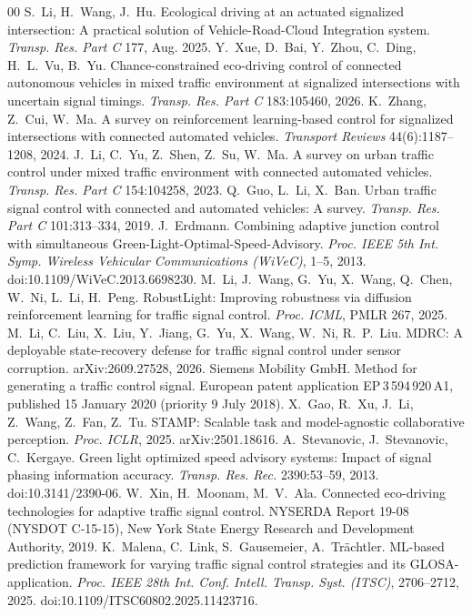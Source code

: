 \begin{thebibliography}{00}
 S.~Li, H.~Wang, J.~Hu. Ecological driving at an actuated signalized intersection: A practical solution of Vehicle-Road-Cloud Integration system. \emph{Transp. Res. Part C} 177, Aug. 2025.
 Y.~Xue, D.~Bai, Y.~Zhou, C.~Ding, H.~L.~Vu, B.~Yu. Chance-constrained eco-driving control of connected autonomous vehicles in mixed traffic environment at signalized intersections with uncertain signal timings. \emph{Transp. Res. Part C} 183:105460, 2026.
 K.~Zhang, Z.~Cui, W.~Ma. A survey on reinforcement learning-based control for signalized intersections with connected automated vehicles. \emph{Transport Reviews} 44(6):1187--1208, 2024.
 J.~Li, C.~Yu, Z.~Shen, Z.~Su, W.~Ma. A survey on urban traffic control under mixed traffic environment with connected automated vehicles. \emph{Transp. Res. Part C} 154:104258, 2023.
 Q.~Guo, L.~Li, X.~Ban. Urban traffic signal control with connected and automated vehicles: A survey. \emph{Transp. Res. Part C} 101:313--334, 2019.
 J.~Erdmann. Combining adaptive junction control with simultaneous Green-Light-Optimal-Speed-Advisory. \emph{Proc. IEEE 5th Int. Symp. Wireless Vehicular Communications (WiVeC)}, 1--5, 2013. doi:10.1109/WiVeC.2013.6698230.
 M.~Li, J.~Wang, G.~Yu, X.~Wang, Q.~Chen, W.~Ni, L.~Li, H.~Peng. RobustLight: Improving robustness via diffusion reinforcement learning for traffic signal control. \emph{Proc. ICML}, PMLR 267, 2025.
 M.~Li, C.~Liu, X.~Liu, Y.~Jiang, G.~Yu, X.~Wang, W.~Ni, R.~P.~Liu. MDRC: A deployable state-recovery defense for traffic signal control under sensor corruption. arXiv:2609.27528, 2026.
 Siemens Mobility GmbH. Method for generating a traffic control signal. European patent application EP\,3\,594\,920\,A1, published 15 January 2020 (priority 9 July 2018).
 X.~Gao, R.~Xu, J.~Li, Z.~Wang, Z.~Fan, Z.~Tu. STAMP: Scalable task and model-agnostic collaborative perception. \emph{Proc. ICLR}, 2025. arXiv:2501.18616.
 A.~Stevanovic, J.~Stevanovic, C.~Kergaye. Green light optimized speed advisory systems: Impact of signal phasing information accuracy. \emph{Transp. Res. Rec.} 2390:53--59, 2013. doi:10.3141/2390-06.
 W.~Xin, H.~Moonam, M.~V.~Ala. Connected eco-driving technologies for adaptive traffic signal control. NYSERDA Report 19-08 (NYSDOT C-15-15), New York State Energy Research and Development Authority, 2019.
 K.~Malena, C.~Link, S.~Gausemeier, A.~Tr\"achtler. ML-based prediction framework for varying traffic signal control strategies and its GLOSA-application. \emph{Proc. IEEE 28th Int. Conf. Intell. Transp. Syst. (ITSC)}, 2706--2712, 2025. doi:10.1109/ITSC60802.2025.11423716.

\end{thebibliography}
